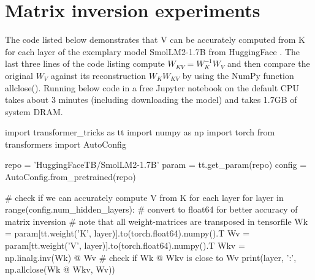 \documentclass{article}
\begin{document}



\clearpage
\onecolumn
\appendix

\section{Matrix inversion experiments}
The code listed below demonstrates that V can be accurately computed from K for each layer of the exemplary model SmolLM2-1.7B from HuggingFace \citep{smollm}. The last three lines of the code listing compute $W_{KV} = W_K^{-1} W_V$ and then compare the original $W_V$ against its reconstruction $W_K W_{KV}$ by using the NumPy function allclose(). Running below code in a free Jupyter notebook on the default CPU takes about 3 minutes (including downloading the model) and takes 1.7GB of system DRAM.

\begin{python}
import transformer_tricks as tt
import numpy as np
import torch
from transformers import AutoConfig

repo = 'HuggingFaceTB/SmolLM2-1.7B'
param = tt.get_param(repo)
config = AutoConfig.from_pretrained(repo)

# check if we can accurately compute V from K for each layer
for layer in range(config.num_hidden_layers):
  # convert to float64 for better accuracy of matrix inversion
  # note that all weight-matrices are transposed in tensorfile
  Wk = param[tt.weight('K', layer)].to(torch.float64).numpy().T
  Wv = param[tt.weight('V', layer)].to(torch.float64).numpy().T
  Wkv = np.linalg.inv(Wk) @ Wv
  # check if Wk @ Wkv is close to Wv
  print(layer, ':', np.allclose(Wk @ Wkv, Wv))
\end{python}
\end{document}
